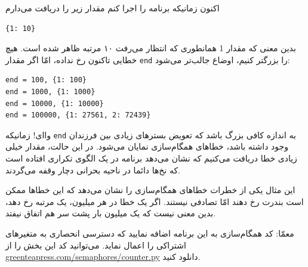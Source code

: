 \documentclass{book}
\begin{document}
    اکنون زمانیکه برنامه را اجرا کنم مقدار زیر را دریافت می‌دارم 

\begin{latin}
\begin{verbatim}
{1: 10}
\end{verbatim}
\end{latin}
%
    بدین معنی که مقدار 1 همانطوری که انتظار می‌رفت ۱۰ مرتبه ظاهر شده است. 
    هیچ خطایی تاکنون رخ نداده، امّا اگر مقدار {\tt end} را بزرگتر کنیم، اوضاع جالب‌تر می‌شود:‌

\begin{latin}
\begin{verbatim}
end = 100, {1: 100}
end = 1000, {1: 1000}
end = 10000, {1: 10000}
end = 100000, {1: 27561, 2: 72439}
\end{verbatim}
\end{latin}
%
    واای! زمانیکه {\tt end}  به اندازه کافی بزرگ باشد که تعویض بستر‌های زیادی بین فرزندان وجود داشته باشد، خطاهای همگام‌سازی نمایان می‌شود. 
    در این حالت، مقدار خیلی زیادی خطا دریافت می‌کنیم که نشان می‌دهد برنامه در یک الگوی تکراری افتاده است که نخ‌ها دائما در ناحیه بحرانی 
    دچار وقفه می‌گردند. 

    این مثال یکی از خطرات خطاهای همگام‌سازی را نشان می‌دهد  که این خطاها ممکن است بندرت رخ دهند امّا تصادفی نیستند. 
    اگر یک خطا در هر میلیون، یک مرتبه رخ دهد، بدین معنی نیست که یک میلیون بار پشت سر هم اتفاق نیفتد. 

    معمّا: کد همگام‌سازی به این برنامه اضافه نمایید که دسترسی انحصاری به متغیرهای اشتراکی را اعمال نماید. 
    می‌توانید کد این بخش را از \url{greenteapress.com/semaphores/counter.py} دانلود کنید. 
\end{document}
